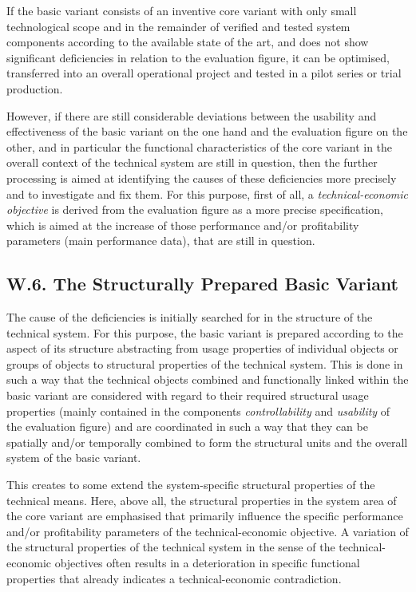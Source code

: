 \documentclass[11pt,a4paper]{article}
\begin{document}
If the basic variant consists of an inventive core variant with only small
technological scope and in the remainder of verified and tested system
components according to the available state of the art, and does not show
significant deficiencies in relation to the evaluation figure, it can be
optimised, transferred into an overall operational project and tested in a
pilot series or trial production.

However, if there are still considerable deviations between the usability and
effectiveness of the basic variant on the one hand and the evaluation figure
on the other, and in particular the functional characteristics of the core
variant in the overall context of the technical system are still in question,
then the further processing is aimed at identifying the causes of these
deficiencies more precisely and to investigate and fix them. For this purpose,
first of all, a \emph{technical-economic objective} is derived from the
evaluation figure as a more precise specification, which is aimed at the
increase of those performance and/or profitability parameters (main
performance data), that are still in question.

\subsection*{W.6. The Structurally Prepared Basic Variant}

The cause of the deficiencies is initially searched for in the structure of
the technical system. For this purpose, the basic variant is prepared
according to the aspect of its structure abstracting from usage properties of
individual objects or groups of objects to structural properties of the
technical system. This is done in such a way that the technical objects
combined and functionally linked within the basic variant are considered with
regard to their required structural usage properties (mainly contained in the
components \emph{controllability} and \emph{usability} of the evaluation
figure) and are coordinated in such a way that they can be spatially and/or
temporally combined to form the structural units and the overall system of the
basic variant.

This creates to some extend the system-specific structural properties of the
technical means.  Here, above all, the structural properties in the system
area of the core variant are emphasised that primarily influence the specific
performance and/or profitability parameters of the technical-economic
objective.  A variation of the structural properties of the technical system
in the sense of the technical-economic objectives often results in a
deterioration in specific functional properties that already indicates a
technical-economic contradiction.
\end{document}
